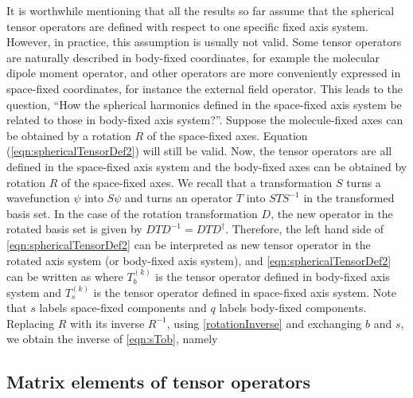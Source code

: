It is worthwhile mentioning that all the results  so far assume that the spherical
tensor operators are defined with respect to one specific fixed axis system. However,
 in practice, this assumption is usually not valid. Some tensor operators are naturally described in body-fixed coordinates, for example the molecular
dipole moment operator, and other operators are more conveniently expressed in space-fixed coordinates, for instance
the external field operator.  This leads to the question, ``How the spherical harmonics defined in the 
space-fixed axis system 
be related to those in body-fixed axis system?''. 
Suppose the molecule-fixed axes can be obtained by a rotation $R$ of the 
space-fixed axes. Equation (\ref{eqn:sphericalTensorDef2}) will still be valid.
Now, the tensor operators are all defined in the space-fixed axis system and the body-fixed axes can be obtained by rotation 
$R$ of the space-fixed axes. We recall that a transformation $S$ turns a wavefunction $\psi$ into  $S\psi$ and  turns 
an operator $T$ into $S T S^{-1}$ in the transformed basis set. In the case of the rotation transformation $D$, 
the new operator in the rotated basis set is given by $D T D^{-1} = D T D^{\dagger}$. Therefore, the left hand side of
\autoref{eqn:sphericalTensorDef2} can be interpreted as new tensor operator in the rotated axis system (or body-fixed axis
 system), and \autoref{eqn:sphericalTensorDef2} can be written as
where $T_{b}^{(k)}$ is the tensor operator defined in body-fixed axis system and $T_{s}^{(k)}$ is the tensor operator
defined in space-fixed axis system. Note that $s$ labels space-fixed components and $q$ labels body-fixed 
components. Replacing $R$ with its inverse $R^{-1}$, using \autoref{rotationInverse} and exchanging $b$ and $s$, we obtain the inverse of
 \autoref{eqn:sTob}, namely


\subsection{Matrix elements of tensor operators} 

